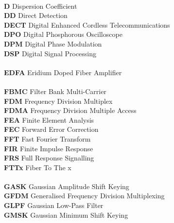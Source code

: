 \begin{multicols}{2}
\begin{tabbing}
\\
\textbf{D}		\>	Dispersion Coefficient								\\
\textbf{DD}		\>	Direct Detection								\\
\textbf{DECT}		\>	Digital Enhanced Cordless Telecommunications					\\
\textbf{DPO}		\>	Digital Phosphorous Oscilloscope						\\
\textbf{DPM}		\>	Digital Phase Modulation							\\
\textbf{DSP}		\>	Digital Signal Processing							\\
\\
\textbf{EDFA}		\>	Eridium Doped Fiber Amplifier					\\
\\
\textbf{FBMC}		\>	Filter Bank Multi-Carrier						\\
\textbf{FDM}		\>	Frequency Division Multiplex					\\
\textbf{FDMA}		\>	Frequency Division Multiple Access				\\
\textbf{FEA}		\>	Finite Element Analysis							\\
\textbf{FEC}		\>	Forward Error Correction						\\
\textbf{FFT}		\>	Fast Fourier Transform							\\
\textbf{FIR}		\>	Finite Impulse Response							\\
\textbf{FRS}		\>	Full Response Signalling						\\
\textbf{FTTx}		\>	Fiber To The x									\\
\\
\textbf{GASK}		\>	Gaussian Amplitude Shift Keying					\\
\textbf{GFDM}		\>	Generalised Frequency Division Multiplexing		\\
\textbf{GLPF}		\>	Gaussian Low-Pass Filter						\\
\textbf{GMSK}		\>	Gaussian Minimum Shift Keying					\\

\end{tabbing}
\end{multicols}
